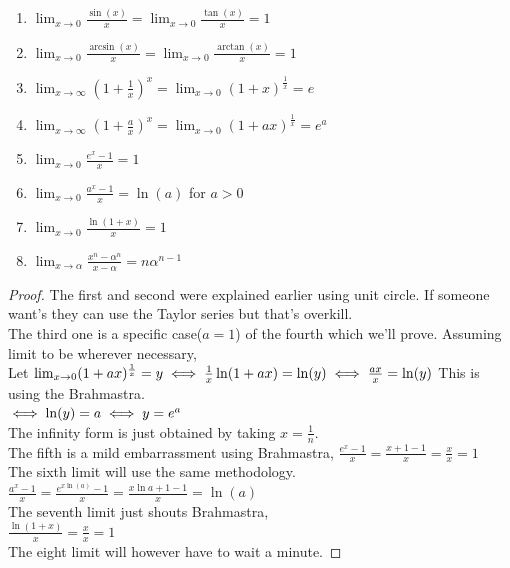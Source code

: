 \begin{theorem}
    \begin{enumerate}
    \item $\lim_{x \to 0}\frac{\sin(x)}{x}=\lim_{x \to 0}\frac{\tan(x)}{x}=1$
    \item $\lim_{x \to 0}\frac{\arcsin(x)}{x}=\lim_{x \to 0}\frac{\arctan(x)}{x}=1$
    \item $\lim_{x \to \infty}(1+\frac{1}{x})^x=\lim_{x \to 0}(1+x)^{\frac{1}{x}}=e$
    \item $\lim_{x \to \infty}(1+\frac{a}{x})^x=\lim_{x \to 0}(1+ax)^{\frac{1}{x}}=e^a$
    \item $\lim_{x \to 0} \frac{e^x-1}{x}=1$
    \item $\lim_{x \to 0} \frac{a^x-1}{x}=\ln(a)$ for $a>0$
    \item $\lim_{x \to 0} \frac{\ln(1+x)}{x}=1$
    \item $\lim_{x \to \alpha}\frac{x^n-\alpha^n}{x-\alpha}=n\alpha^{n-1}$
\end{enumerate}
\end{theorem}
\begin{proof}
    The first and second were explained earlier using unit circle. If someone want's they can use the Taylor series but that's overkill.\\
    The third one is a specific case($a=1$) of the fourth which we'll prove. Assuming limit to be wherever necessary,\\
    Let $\lim_{x \to 0}(1+ax)^{\frac{1}{x}}=y\\
    \iff \frac{1}{x} \ln(1+ax)=\ln(y)\\
    \iff \frac{ax}{x}= \ln(y)$ This is using the Brahmastra.\\
    $\iff \ln(y)=a\\
    \iff y=e^a$\\
    The infinity form is just obtained by taking $x=\frac{1}{n}$.\\
    The fifth is a mild embarrassment using Brahmastra, $\frac{e^x-1}{x}=\frac{x+1-1}{x}=\frac{x}{x}=1$\\
    The sixth limit will use the same methodology. $\frac{a^x-1}{x}=\frac{e^{x\ln(a)}-1}{x}=\frac{x\ln{a}+1-1}{x}=\ln(a)$\\
    The seventh limit just shouts Brahmastra,\\
    $\frac{\ln(1+x)}{x}=\frac{x}{x}=1$\\
    The eight limit will however have to wait a minute.
\end{proof}
